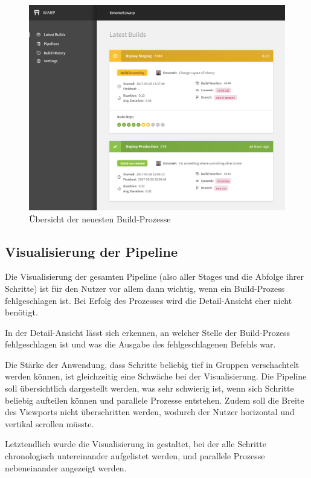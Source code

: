 \begin{figure}[H]
  \caption{Übersicht der neuesten Build-Prozesse}
  \label{fig:latest-builds}
  \centering
    \includegraphics[width=\textwidth]{assets/latest-builds}
\end{figure}

\subsection{Visualisierung der Pipeline}

Die Visualisierung der gesamten Pipeline (also aller Stages und die Abfolge ihrer Schritte) ist für den Nutzer vor allem dann wichtig, wenn ein Build-Prozess fehlgeschlagen ist. Bei Erfolg des Prozesses wird die Detail-Ansicht eher nicht benötigt.

In der Detail-Ansicht lässt sich erkennen, an welcher Stelle der Build-Prozess fehlgeschlagen ist und was die Ausgabe des fehlgeschlagenen Befehls war.

Die Stärke der Anwendung, dass Schritte beliebig tief in Gruppen verschachtelt werden können, ist gleichzeitig eine Schwäche bei der Visualisierung. Die Pipeline soll übersichtlich dargestellt werden, was sehr schwierig ist, wenn sich Schritte beliebig aufteilen können und parallele Prozesse entstehen. Zudem soll die Breite des Viewports nicht überschritten werden, wodurch der Nutzer horizontal und vertikal scrollen müsste.

Letztendlich wurde die Visualisierung in  gestaltet, bei der alle Schritte chronologisch untereinander aufgelistet werden, und parallele Prozesse nebeneinander angezeigt werden.

